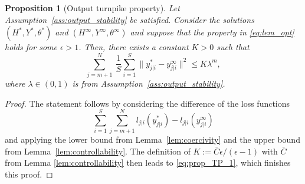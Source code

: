 \documentclass[10pt,a4paper]{amsart}
\newtheorem{prop}{Proposition}
\begin{document}
\begin{prop}[Output turnpike property]\label{prop:TP}
	Let Assumption~\ref{ass:output_stability} be satisfied.
	Consider the solutions $(H^*,Y^*,\theta^*)$ and $(H^\infty,Y^\infty,\theta^\infty)$ and suppose that the property in \eqref{eq:lem_opt} holds for some $\epsilon>1$. Then, there exists a constant $K>0$ such that
	\begin{equation}\label{eq:prop_TP_1}
	 	\sum_{j=m+1}^{N} \ \frac{1}{S}\sum_{i=1}^{S}\|{y}_{j|i}^*-{y}_{j|i}^\infty\|^2 \leq K\lambda^m,
	\end{equation}
	where $\lambda\in(0,1)$ is from Assumption~\ref{ass:output_stability}.
\end{prop}

\begin{proof}
	The statement follows by considering the difference of the loss functions
	\begin{equation*}
		\sum_{i=1}^{S}\sum_{j=m+1}^{N}l_{j|i}({y}_{j|i}^*)-l_{j|i}({y}^\infty_{j|i})
	\end{equation*}
	 and applying the lower bound from Lemma~\ref{lem:coercivity} and the upper bound from Lemma~\ref{lem:controllability}. The definition of $K:=\bar{C}{\epsilon}/({\epsilon-1})$ with $\bar{C}$ from Lemma \ref{lem:controllability} then leads to \eqref{eq:prop_TP_1}, which finishes this proof.
\end{proof}
\end{document}
